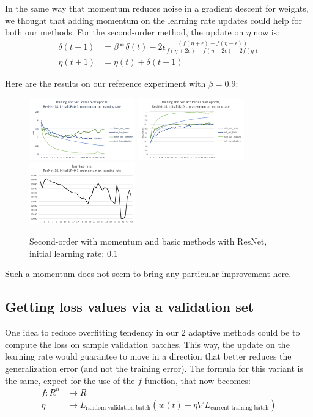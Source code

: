 \documentclass{article}
\begin{document}
  In the same way that momentum reduces noise in a gradient descent for weights, we thought that adding momentum on the learning rate updates could help for both our methods. For the second-order method, the update on $\eta$ now is:\\
  \begin{align}
  \delta(t+1) &= \beta*\delta(t) - 2\epsilon\frac{(f(\eta+\epsilon)-f(\eta-\epsilon))}{f(\eta+2\epsilon)+f(\eta-2\epsilon)-2f(\eta)}\\
  \eta(t+1) &= \eta(t) + \delta(t+1)
  \end{align}
  
  Here are the results on our reference experiment with $\beta=0.9$:\\
  
  \begin{figure}[!h]
  	\includegraphics[width=130pt]{loss_resnet_mom_lr_0_1.png}
  	\includegraphics[width=130pt]{acc_resnet_mom_lr_0_1.png}
  	\includegraphics[width=130pt]{lr_resnet_mom_lr_0_1.png}
  	\caption{Second-order with momentum and basic methods with ResNet, initial learning rate: 0.1}
  \end{figure}

  Such a momentum does not seem to bring any particular improvement here. 
  
  \subsection{Getting loss values via a validation set}
  
  One idea to reduce overfitting tendency in our 2 adaptive methods could be to compute the loss on sample validation batches. This way, the update on the learning rate would guarantee to move in a direction that better reduces the generalization error (and not the training error). The formula for this variant is the same, expect for the use of the $f$ function, that now becomes:\\
  \begin{align}
  f : R^{n} &\rightarrow R\\
  \eta &\rightarrow L_{\text{random validation batch}}(w(t)-\eta \nabla L_{\text{current training batch}})
  \end{align}
  
\end{document}
